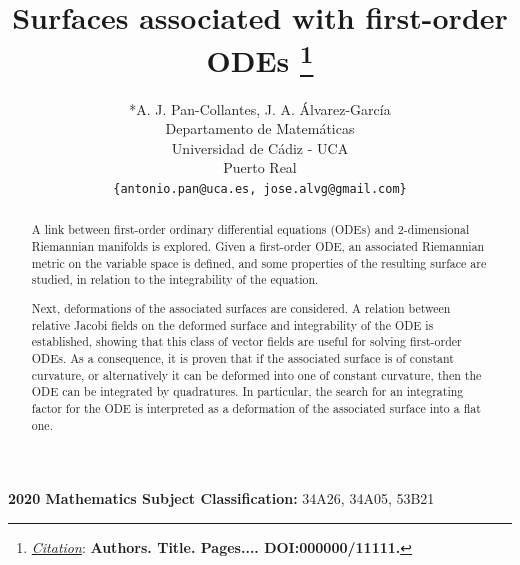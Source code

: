 \documentclass{article}
\title{Surfaces associated with first-order ODEs
\thanks{\textit{\underline{Citation}}: 
\textbf{Authors. Title. Pages.... DOI:000000/11111.}} 
}
\author{
  *A. J. Pan-Collantes, J. A. Álvarez-García\\
  Departamento de Matem\'aticas\\ 
  Universidad de C\'{a}diz - UCA \\
  Puerto Real\\
  \texttt{\{antonio.pan@uca.es, jose.alvg@gmail.com\}} \\
}
\theoremstyle{remark}
\theoremstyle{definition}
\begin{document}
\newpage
\maketitle

\begin{abstract}
A link between first-order ordinary differential equations (ODEs) and 2-dimensional Riemannian manifolds is explored. Given a first-order ODE, an associated Riemannian metric on the variable space is defined, and some properties of the resulting surface are studied, in relation to the integrability of the equation. 

Next, deformations of the associated surfaces are considered. A relation between relative Jacobi fields on the deformed surface and integrability of the ODE is established, showing that this class of vector fields are useful for solving first-order ODEs. As a consequence, it is proven that if the associated surface is of constant curvature, or alternatively it can be deformed into one of constant curvature, then the ODE can be integrated by quadratures. In particular, the search for an integrating factor for the ODE is interpreted as a deformation of the associated surface into a flat one.
\end{abstract}


\textbf{2020 Mathematics Subject Classification:} 34A26, 34A05, 53B21










\end{document}
